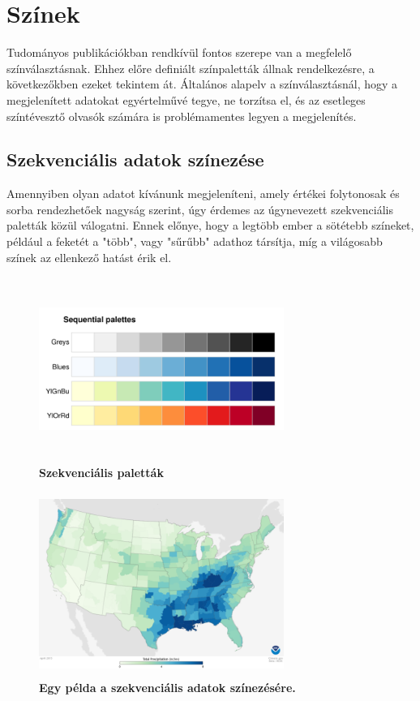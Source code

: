 \documentclass[12pt]{article}
\theoremstyle{plain}
\begin{document}
 \section{Színek}
 Tudományos publikációkban rendkívül fontos szerepe van a megfelelő színválasztásnak. Ehhez előre definiált színpaletták állnak rendelkezésre, a következőkben ezeket tekintem át. Általános alapelv a színválasztásnál, hogy a megjelenített adatokat egyértelművé tegye, ne torzítsa el, és az esetleges színtévesztő olvasók számára is problémamentes legyen a megjelenítés.
 
 \subsection{Szekvenciális adatok színezése}
 
 Amennyiben olyan adatot kívánunk megjeleníteni, amely értékei folytonosak és sorba rendezhetőek nagyság szerint, úgy érdemes az úgynevezett szekvenciális paletták közül válogatni. Ennek előnye, hogy a legtöbb ember a sötétebb színeket, például a feketét a "több", vagy "sűrűbb" adathoz társítja, míg a világosabb színek az ellenkező hatást érik el. 
 
 \begin{figure}[H]
    \centering
    \includegraphics[width=8cm, height=6cm]{media/sequential.png}
    \caption{\textbf{Szekvenciális paletták}}
    \label{fig:GeneralDiagram}
 \end{figure}
 
  \begin{figure}[H]
    \centering
    \includegraphics[width=8cm, height=6cm]{media/map.png}
    \caption{\textbf{Egy példa a szekvenciális adatok színezésére.}}
    \label{fig:GeneralDiagram}
 \end{figure}
\end{document}
